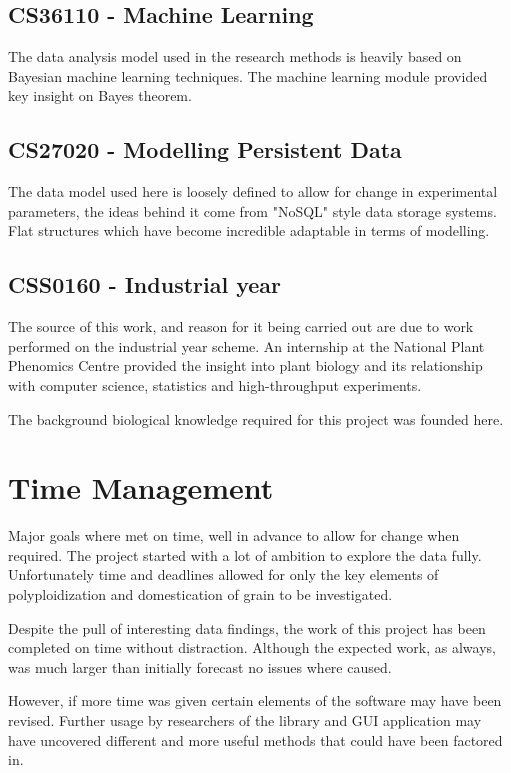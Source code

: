 \documentclass[11pt]{report}
\begin{document}
\subsection{CS36110 - Machine Learning}
\label{sec:orgcdf3e34}
The data analysis model used in the research methods is heavily based on Bayesian machine learning techniques. The machine learning module provided key insight on Bayes theorem.
\subsection{CS27020 - Modelling Persistent Data}
\label{sec:orga12ce35}
The data model used here is loosely defined to allow for change in experimental parameters, the ideas behind it come from "NoSQL" style data storage systems. Flat structures which have become incredible adaptable in terms of modelling.
\subsection{CSS0160 - Industrial year}
\label{sec:org8522899}
The source of this work, and reason for it being carried out are due to work performed on the industrial year scheme. An internship at the National Plant Phenomics Centre provided the insight into plant biology and its relationship with computer science, statistics and high-throughput experiments.

The background biological knowledge required for this project was founded here.

\section{Time Management}
\label{sec:orgda6eb35}
Major goals where met on time, well in advance to allow for change when required. The project started with a lot of ambition to explore the data fully. Unfortunately time and deadlines allowed for only the key elements of polyploidization and domestication of grain to be investigated.

Despite the pull of interesting data findings, the work of this project has been completed on time without distraction. Although the expected work, as always, was much larger than initially forecast no issues where caused.

However, if more time was given certain elements of the software may have been revised. Further usage by researchers of the library and GUI application may have uncovered  different and more useful methods that could have been factored in.
\end{document}
